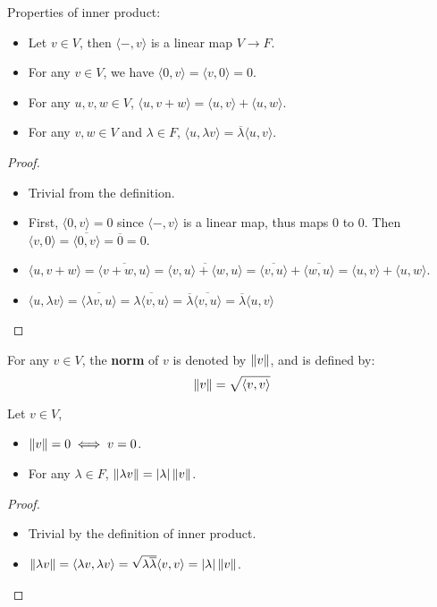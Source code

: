 \documentclass[../main.tex]{subfiles}
\begin{document}
\setcounter{theorem}{5}
\begin{theorem}
  Properties of inner product:
  \begin{itemize}
    \item Let $v \in V$, then $\langle -, v \rangle$ is a linear map $V \rightarrow F$.
    \item For any $v \in V$, we have $\langle 0, v \rangle = \langle v, 0 \rangle = 0$.
    \item For any $u, v, w \in V$, $\langle u, v + w \rangle = \langle u, v \rangle + \langle u, w \rangle$.
    \item For any $v, w \in V$ and $\lambda \in F$, $\langle u, \lambda v \rangle = \overline{\lambda} \langle u, v \rangle$.
  \end{itemize}
\end{theorem}
\begin{proof}
  ~
  \begin{itemize}
    \item Trivial from the definition.
    \item First, $\langle 0, v \rangle = 0$ since $\langle -, v\rangle$ is a linear map, thus maps $0$ to $0$.
          Then $\langle v, 0 \rangle = \overline{\langle 0, v \rangle} = \overline{0} = 0$.
    \item $\langle u, v + w \rangle = \overline{\langle v + w, u \rangle} = \overline{\langle v, u \rangle + \langle w, u \rangle} = \overline{\langle v, u \rangle} + \overline{\langle w, u \rangle} = \langle u, v \rangle + \langle u, w \rangle$.
    \item $\langle u, \lambda v \rangle = \overline{\langle \lambda v, u \rangle} = \overline{\lambda \langle v, u \rangle} = \overline{\lambda} \overline{\langle v, u \rangle} = \overline{\lambda} \langle u, v \rangle$
  \end{itemize}
\end{proof}

\setcounter{definition}{6}
\begin{definition}
  For any $v \in V$, the \textbf{norm} of $v$ is denoted by $\left\Vert v \right\Vert$,
  and is defined by:
  \[
  \left\Vert v \right\Vert = \sqrt{\langle v , v\rangle}
  \]
\end{definition}

\setcounter{theorem}{8}
\begin{theorem}
  Let $v \in V$,
  \begin{itemize}
    \item $\left\Vert v \right\Vert = 0 \iff v = 0$.
    \item For any $\lambda \in F$, $\left\Vert \lambda v \right\Vert = |\lambda| \left\Vert v \right\Vert$.
  \end{itemize}
\end{theorem}
\begin{proof}
  ~
  \begin{itemize}
    \item Trivial by the definition of inner product.
    \item $\left\Vert \lambda v \right\Vert = \langle \lambda v , \lambda v\rangle = \sqrt{\lambda \overline{\lambda}} \langle v , v\rangle = |\lambda| \left\Vert v \right\Vert$.
  \end{itemize}
\end{proof}
\end{document}
